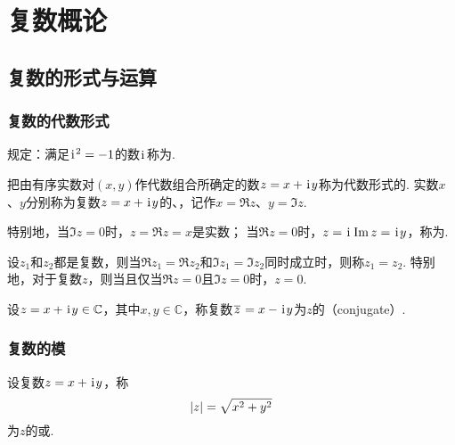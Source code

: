\chapter{复数概论}
\section{复数的形式与运算}
\subsection{复数的代数形式}
\begin{definition}[虚数单位]
规定：满足\(\kern1pt\mathrm{i}\kern1pt^2=-1\)的数\(\kern1pt\mathrm{i}\kern1pt\)称为.
\end{definition}

\begin{definition}
把由有序实数对\((x,y)\)作代数组合所确定的数\(z=x+\kern1pt\mathrm{i}\kern1pt y\)称为代数形式的.
实数\(x\)、\(y\)分别称为复数\(z=x+\kern1pt\mathrm{i}\kern1pt y\)的、，记作\(x=\Re z\)、\(y=\Im z\).

特别地，当\(\Im z=0\)时，\(z=\Re z=x\)是实数；
当\(\Re z=0\)时，\(z=\kern1pt\mathrm{i}\kern1pt\Im z=\kern1pt\mathrm{i}\kern1pt y\)，称为.
\end{definition}

\begin{definition}[代数形式下复数相等条件]
设\(z_1\)和\(z_2\)都是复数，则当\(\Re z_1 = \Re z_2\)和\(\Im z_1 = \Im z_2\)同时成立时，则称\(z_1 = z_2\).
特别地，对于复数\(z\)，则当且仅当\(\Re z=0\)且\(\Im z=0\)时，\(z=0\).
\end{definition}

\begin{definition}[共轭复数]
设\(z=x + \kern1pt\mathrm{i}\kern1pt y \in\mathbb{C}\)，其中\(x,y\in\mathbb{C}\)，称复数\(\kern1pt\overline{z}\kern1pt=x - \kern1pt\mathrm{i}\kern1pt y\)为\(z\)的（conjugate）.
\end{definition}

\subsection{复数的模}
\begin{definition}[复数的模]
设复数\(z = x + \kern1pt\mathrm{i}\kern1pt y\)，称\[
\abs{z} = \sqrt{x^2 + y^2}
\]为\(z\)的或.
\end{definition}

